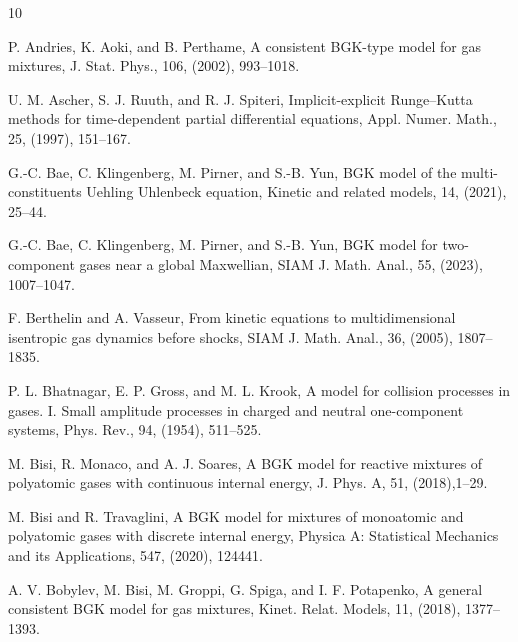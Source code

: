 \documentclass[10pt,reqno]{amsart}
\numberwithin{equation}{section}
\begin{document}
 






	
	


%
%
%
%

\begin{thebibliography}{10}

 P.  Andries, K. Aoki, and B. Perthame, A consistent BGK-type model for gas mixtures, J. Stat. Phys., 106, (2002), 993--1018.

 U. M. Ascher, S. J. Ruuth, and R. J. Spiteri, Implicit-explicit Runge--Kutta methods for time-dependent partial differential equations, Appl. Numer. Math., 25, (1997), 151--167.

 
G.-C. Bae, C. Klingenberg,  M. Pirner, and S.-B. Yun,  BGK model of the multi-constituents Uehling Uhlenbeck equation, Kinetic and related models, 14, (2021), 25--44.

 G.-C. Bae, C. Klingenberg, M. Pirner, and S.-B. Yun,  BGK model for two-component gases near a global Maxwellian, SIAM J. Math. Anal., 55, (2023), 1007--1047.

 F. Berthelin and A. Vasseur, From kinetic equations to multidimensional isentropic gas dynamics before shocks, SIAM J. Math. Anal., 36, (2005), 1807--1835.

 P. L. Bhatnagar, E. P. Gross, and M. L. Krook, A model for collision processes in gases. I. Small amplitude processes in charged and neutral one-component systems, Phys. Rev., 94, (1954), 511--525. 

M. Bisi, R. Monaco, and A. J. Soares, A BGK model for reactive mixtures of polyatomic gases with
continuous internal energy, J. Phys. A, 51, (2018),1--29.

 M. Bisi and R. Travaglini,  A BGK model for mixtures of monoatomic and polyatomic gases with discrete internal energy, Physica A: Statistical Mechanics and its Applications, 547, (2020),  124441.


A. V. Bobylev, M. Bisi, M. Groppi, G. Spiga, and I. F. Potapenko,   A general consistent BGK model for
gas mixtures, Kinet. Relat. Models, 11, (2018), 1377--1393.


\end{thebibliography}
\end{document}
